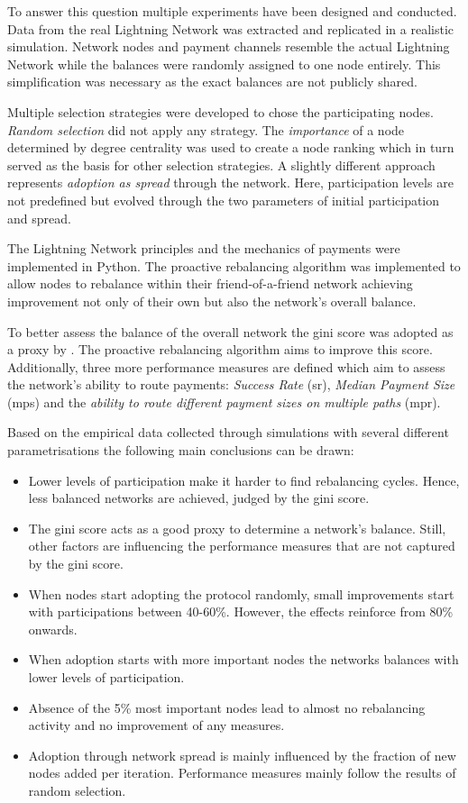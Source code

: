 \documentclass[final]{fhnwreport}       %
\begin{document}
To answer this question multiple experiments have been designed and conducted. Data from the real Lightning Network was extracted and replicated in a realistic simulation. Network nodes and payment channels resemble the actual Lightning Network while the balances were randomly assigned to one node entirely. This simplification was necessary as the exact balances are not publicly shared.

Multiple selection strategies were developed to chose the participating nodes. \emph{Random selection} did not apply any strategy. The \emph{importance} of a node determined by degree centrality was used to create a node ranking which in turn served as the basis for other selection strategies. A slightly different approach represents \emph{adoption as spread} through the network. Here, participation levels are not predefined but evolved through the two parameters of initial participation and spread.

The Lightning Network principles and the mechanics of payments were implemented in Python. The proactive rebalancing algorithm was implemented to allow nodes to rebalance within their friend-of-a-friend network achieving improvement not only of their own but also the network's overall balance. 

To better assess the balance of the overall network the \gls{gini} score was adopted as a \gls{proxy} by \textcite{pickhardt_imbalance_2019}. The proactive rebalancing algorithm aims to improve this score. Additionally, three more performance measures are defined which aim to assess the network's ability to route payments: \emph{Success Rate} (\gls{sr}), \emph{Median Payment Size} (\gls{mps}) and the \emph{ability to route different payment sizes on multiple paths} (\gls{mpr}). 

Based on the empirical data collected through simulations with several different parametrisations the following main conclusions can be drawn:

\begin{itemize}
  \item Lower levels of participation make it harder to find rebalancing cycles. Hence, less balanced networks are achieved, judged by the \gls{gini} score.
  \item The \gls{gini} score acts as a good \gls{proxy} to determine a network's balance. Still, other factors are influencing the performance measures that are not captured by the \gls{gini} score.
  \item When nodes start adopting the protocol randomly, small improvements start with participations between 40-60\%. However, the effects reinforce from 80\% onwards.
  \item When adoption starts with more important nodes the networks balances with lower levels of participation.
  \item Absence of the 5\% most important nodes lead to almost no rebalancing activity and no improvement of any measures. 
  \item Adoption through network spread is mainly influenced by the fraction of new nodes added per iteration. Performance measures mainly follow the results of random selection.
\end{itemize}
\end{document}
